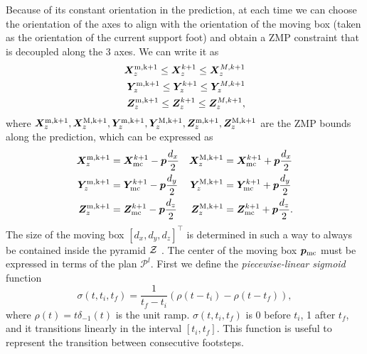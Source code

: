 Because of its constant orientation in the prediction, at each time we can
choose the orientation of the axes to align with the orientation of the moving
box (taken as the orientation of the current support foot) and obtain a ZMP
constraint that is decoupled along the 3 axes. We can write it as
\begin{align}
    \label{eq:ZMP-constraints}
    \begin{split}
        \bm{X}_z^{\rm m,k+1} \le \bm{X}_z^{k+1} \le \bm{X}_z^{M,k+1} \\
        \bm{Y}_z^{\rm m,k+1} \le \bm{Y}_z^{k+1} \le \bm{Y}_z^{M,k+1} \\
        \bm{Z}_z^{\rm m,k+1} \le \bm{Z}_z^{k+1} \le \bm{Z}_z^{M,k+1},
    \end{split}
\end{align}
where $\bm{X}_z^{\rm m,k+1}, \bm{X}_z^{\rm M,k+1}, \bm{Y}_z^{\rm m,k+1},
\bm{Y}_z^{\rm M,k+1}, \bm{Z}_z^{\rm m,k+1}, \bm{Z}_z^{\rm M,k+1}$
are the ZMP bounds along the prediction, which can be expressed as
\begin{equation}
    \begin{aligned}
        \bm{X}_z^{\rm m,k+1} &= \bm{X}_{\rm mc}^{k+1} - {\bm{p}} \frac{d_x}{2} &
        \bm{X}_z^{\rm M,k+1} &= \bm{X}_{\rm mc}^{k+1} + {\bm{p}} \frac{d_x}{2} \\
        \bm{Y}_z^{\rm m,k+1} &= \bm{Y}_{\rm mc}^{k+1} - {\bm{p}} \frac{d_y}{2} &
        \bm{Y}_z^{\rm M,k+1} &= \bm{Y}_{\rm mc}^{k+1} + {\bm{p}} \frac{d_y}{2} \\
        \bm{Z}_z^{\rm m,k+1} &= \bm{Z}_{\rm mc}^{k+1} - {\bm{p}} \frac{d_z}{2} &
        \bm{Z}_z^{\rm M,k+1} &= \bm{Z}_{\rm mc}^{k+1} + {\bm{p}} \frac{d_z}{2}.
    \end{aligned}
\label{eq:FAPA:zmp_constraint_displacement}
\end{equation}
The size of the moving box $[d_x, d_y, d_z]^\top$ is
determined in such a way to always be contained inside the pyramid $\cal Z$
\cite{Zamparelli2018SYROCO, Cipriano2023RAS}.
The center of the moving box ${\bm{p}}_{\rm mc}$ must be expressed in terms of
the plan $\mathcal{P}^l$. First we define the {\em piecewise-linear sigmoid}
function 
\begin{equation*}
\sigma (t,t_i,t_f)=\frac{1}{t_f-t_i} \left(\rho(t-t_i)-\rho(t-t_f)\right),
\end{equation*}
where $\rho(t)=t\delta_{-1}(t)$ is the unit ramp.
$\sigma (t,t_i,t_f)$ is 0 before $t_i$,  1 after $t_f$, and it transitions
linearly in the interval $[t_i,t_f]$. This function is useful to represent
the transition between consecutive footsteps.

